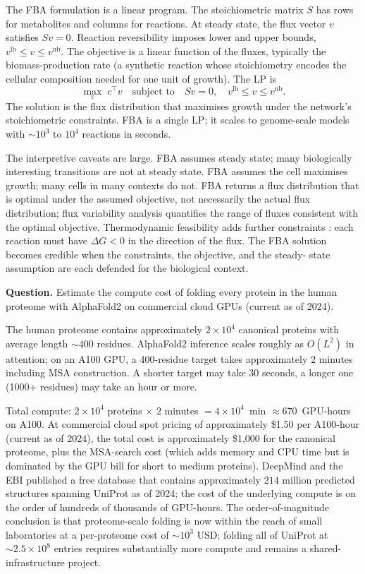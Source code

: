 The FBA formulation is a linear program. The stoichiometric matrix
$S$ has rows for metabolites and columns for reactions. At steady state,
the flux vector $v$ satisfies $S v = 0$. Reaction reversibility imposes
lower and upper bounds, $v^{\mathrm{lb}} \leq v \leq v^{\mathrm{ub}}$.
The objective is a linear function of the fluxes, typically the
biomass-production rate (a synthetic reaction whose stoichiometry
encodes the cellular composition needed for one unit of growth). The
LP is
\[
\max_{v}\; c^{\top} v \quad \text{subject to} \quad S v = 0, \quad
v^{\mathrm{lb}} \leq v \leq v^{\mathrm{ub}}.
\]
The solution is the flux distribution that maximises growth under the
network's stoichiometric constraints. FBA is a single LP; it scales to
genome-scale models with $\sim 10^{3}$ to $10^{4}$ reactions in
seconds.

The interpretive caveats are large. FBA assumes steady state; many
biologically interesting transitions are not at steady state. FBA
assumes the cell maximises growth; many cells in many contexts do not.
FBA returns a flux distribution that is optimal under the assumed
objective, not necessarily the actual flux distribution; flux
variability analysis quantifies the range of fluxes consistent with
the optimal objective. Thermodynamic feasibility adds further
constraints \cite{paper:v6c11-noor-fluxomics-2014}: each reaction must
have $\Delta G < 0$ in the direction of the flux. The FBA solution
becomes credible when the constraints, the objective, and the steady-
state assumption are each defended for the biological context.

\begin{estimation}
\textbf{Question.}
Estimate the compute cost of folding every protein in the human
proteome with AlphaFold2 on commercial cloud GPUs (current as of 2024).

The human proteome contains approximately $2 \times 10^{4}$ canonical
proteins with average length $\sim 400$ residues. AlphaFold2 inference
scales roughly as $O(L^{2})$ in attention; on an A100 GPU, a 400-residue
target takes approximately $2$ minutes including MSA construction. A
shorter target may take $30$ seconds, a longer one (1000+ residues)
may take an hour or more.

Total compute: $2 \times 10^{4}$ proteins $\times$ $2$ minutes
$= 4 \times 10^{4}$~min $\approx 670$~GPU-hours on A100. At
commercial cloud spot pricing of approximately \$1.50 per A100-hour
(current as of 2024), the total cost is approximately \$1{,}000 for
the canonical proteome, plus the MSA-search cost (which adds memory
and CPU time but is dominated by the GPU bill for short to medium
proteins). DeepMind and the EBI \cite{web:v6c11-alphafold-db-2024}
published a free database that contains approximately $214$ million
predicted structures spanning UniProt as of 2024; the cost of the
underlying compute is on the order of hundreds of thousands of
GPU-hours. The order-of-magnitude conclusion is that proteome-scale
folding is now within the reach of small laboratories at a per-proteome
cost of $\sim 10^{3}$ USD; folding all of UniProt at $\sim 2.5 \times
10^{8}$ entries requires substantially more compute and remains a
shared-infrastructure project.
\end{estimation}


